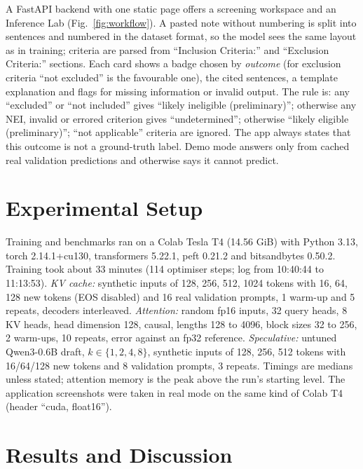 \documentclass[conference]{IEEEtran}
\begin{document}
A FastAPI backend with one static page offers a screening workspace and an Inference Lab (Fig.~\ref{fig:workflow}). A pasted note without numbering is split into sentences and numbered in the dataset format, so the model sees the same layout as in training; criteria are parsed from ``Inclusion Criteria:'' and ``Exclusion Criteria:'' sections. Each card shows a badge chosen by \emph{outcome} (for exclusion criteria ``not excluded'' is the favourable one), the cited sentences, a template explanation and flags for missing information or invalid output. The rule is: any ``excluded'' or ``not included'' gives ``likely ineligible (preliminary)''; otherwise any NEI, invalid or errored criterion gives ``undetermined''; otherwise ``likely eligible (preliminary)''; ``not applicable'' criteria are ignored. The app always states that this outcome is not a ground-truth label. Demo mode answers only from cached real validation predictions and otherwise says it cannot predict. %

\section{Experimental Setup}
Training and benchmarks ran on a Colab Tesla T4 (14.56 GiB) with Python 3.13, torch 2.14.1+cu130, transformers 5.22.1, peft 0.21.2 and bitsandbytes 0.50.2. %
Training took about 33 minutes (114 optimiser steps; log from 10:40:44 to 11:13:53). %
\emph{KV cache:} synthetic inputs of 128, 256, 512, 1024 tokens with 16, 64, 128 new tokens (EOS disabled) and 16 real validation prompts, 1 warm-up and 5 repeats, decoders interleaved. \emph{Attention:} random fp16 inputs, 32 query heads, 8 KV heads, head dimension 128, causal, lengths 128 to 4096, block sizes 32 to 256, 2 warm-ups, 10 repeats, error against an fp32 reference. \emph{Speculative:} untuned Qwen3-0.6B draft, $k\in\{1,2,4,8\}$, synthetic inputs of 128, 256, 512 tokens with 16/64/128 new tokens and 8 validation prompts, 3 repeats. %
Timings are medians unless stated; attention memory is the peak above the run's starting level. The application screenshots were taken in real mode on the same kind of Colab T4 (header ``cuda, float16'').

\section{Results and Discussion}\label{sec:results}
\end{document}
